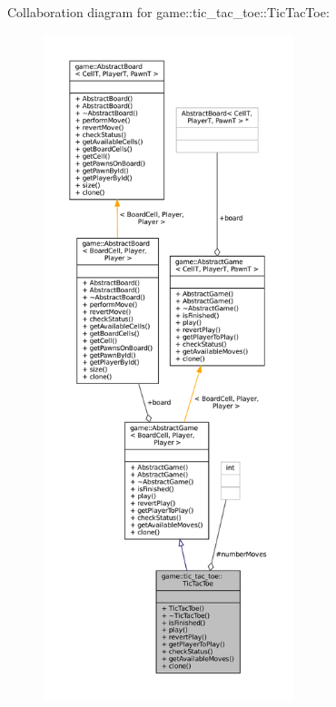 Collaboration diagram for game\+:\+:tic\+\_\+tac\+\_\+toe\+:\+:Tic\+Tac\+Toe\+:
\nopagebreak
\begin{figure}[H]
\begin{center}
\leavevmode
\includegraphics[height=550pt]{classgame_1_1tic__tac__toe_1_1_tic_tac_toe__coll__graph}
\end{center}
\end{figure}
